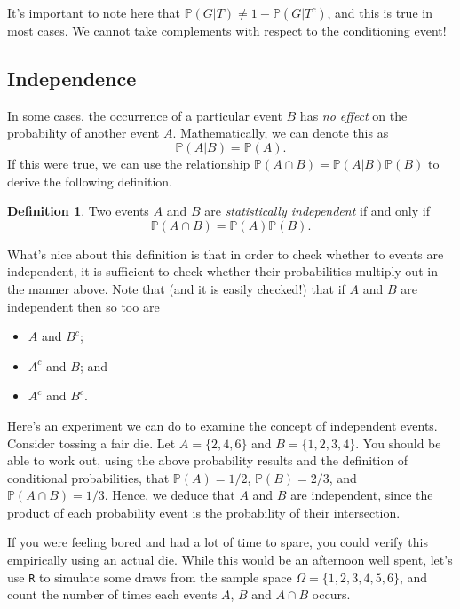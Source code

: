 \documentclass[
]{book}
\providecommand{\tightlist}{%
  \setlength{\itemsep}{0pt}\setlength{\parskip}{0pt}}
\newcommand{\bbP}{\mathbb{P}}
\theoremstyle{definition}
\newtheorem{definition}{Definition}[chapter]
\theoremstyle{definition}
\theoremstyle{definition}
\theoremstyle{definition}
\theoremstyle{remark}
\begin{document}
It's important to note here that \(\bbP(G|T) \neq 1 - \bbP(G|T^c)\), and this is true in most cases. We cannot take complements with respect to the conditioning event!

\hypertarget{independence}{%
\subsection{Independence}\label{independence}}

In some cases, the occurrence of a particular event \(B\) has \emph{no effect} on the probability of another event \(A\). Mathematically, we can denote this as
\[
  \bbP(A | B) = \bbP(A).
\]
If this were true, we can use the relationship \(\bbP(A \cap B) = \bbP(A | B)\bbP(B)\) to derive the following definition.

\begin{definition}
Two events \(A\) and \(B\) are \emph{statistically independent} if and only if
\[
  \bbP(A \cap B) = \bbP(A)\bbP(B).
\]
\end{definition}

What's nice about this definition is that in order to check whether to events are independent, it is sufficient to check whether their probabilities multiply out in the manner above.
Note that (and it is easily checked!) that if \(A\) and \(B\) are independent then so too are

\begin{itemize}
\tightlist
\item
  \(A\) and \(B^c\);
\item
  \(A^c\) and \(B\); and
\item
  \(A^c\) and \(B^c\).
\end{itemize}

Here's an experiment we can do to examine the concept of independent events.
Consider tossing a fair die.
Let \(A = \{2, 4, 6\}\) and \(B = \{1,2,3,4\}\).
You should be able to work out, using the above probability results and the definition of conditional probabilities, that \(\bbP(A)=1/2\), \(\bbP(B)=2/3\), and \(\bbP(A \cap B)=1/3\).
Hence, we deduce that \(A\) and \(B\) are independent, since the product of each probability event is the probability of their intersection.

If you were feeling bored and had a lot of time to spare, you could verify this empirically using an actual die.
While this would be an afternoon well spent, let's use \texttt{R} to simulate some draws from the sample space \(\Omega = \{1,2,3,4,5,6\}\), and count the number of times each events \(A\), \(B\) and \(A \cap B\) occurs.
\end{document}
